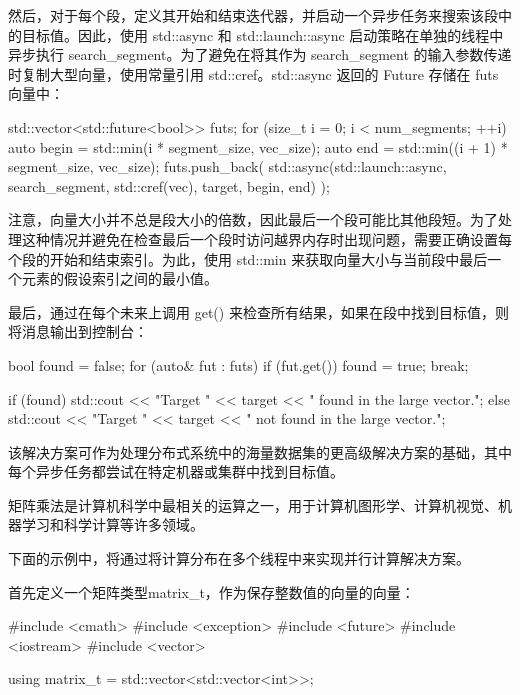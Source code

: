 然后，对于每个段，定义其开始和结束迭代器，并启动一个异步任务来搜索该段中的目标值。因此，使用 std::async 和 std::launch::async 启动策略在单独的线程中异步执行 search\_segment。为了避免在将其作为 search\_segment 的输入参数传递时复制大型向量，使用常量引用 std::cref。std::async 返回的 Future 存储在 futs 向量中：

\begin{cpp}
std::vector<std::future<bool>> futs;
for (size_t i = 0; i < num_segments; ++i) {
    auto begin = std::min(i * segment_size, vec_size);
    auto end = std::min((i + 1) * segment_size, vec_size);
    futs.push_back( std::async(std::launch::async,
                               search_segment,
                               std::cref(vec),
                               target, begin, end) );
}
\end{cpp}

注意，向量大小并不总是段大小的倍数，因此最后一个段可能比其他段短。为了处理这种情况并避免在检查最后一个段时访问越界内存时出现问题，需要正确设置每个段的开始和结束索引。为此，使用 std::min 来获取向量大小与当前段中最后一个元素的假设索引之间的最小值。

最后，通过在每个未来上调用 get() 来检查所有结果，如果在段中找到目标值，则将消息输出到控制台：

\begin{cpp}
bool found = false;
for (auto& fut : futs) {
    if (fut.get()) {
        found = true;
        break;
    }
}

if (found) {
    std::cout << "Target " << target
              << " found in the large vector.\n";
} else {
    std::cout << "Target " << target
              << " not found in the large vector.\n";
}
\end{cpp}

该解决方案可作为处理分布式系统中的海量数据集的更高级解决方案的基础，其中每个异步任务都尝试在特定机器或集群中找到目标值。


矩阵乘法是计算机科学中最相关的运算之一，用于计算机图形学、计算机视觉、机器学习和科学计算等许多领域。

下面的示例中，将通过将计算分布在多个线程中来实现并行计算解决方案。

首先定义一个矩阵类型matrix\_t，作为保存整数值的向量的向量：

\begin{cpp}
#include <cmath>
#include <exception>
#include <future>
#include <iostream>
#include <vector>

using matrix_t = std::vector<std::vector<int>>;
\end{cpp}

